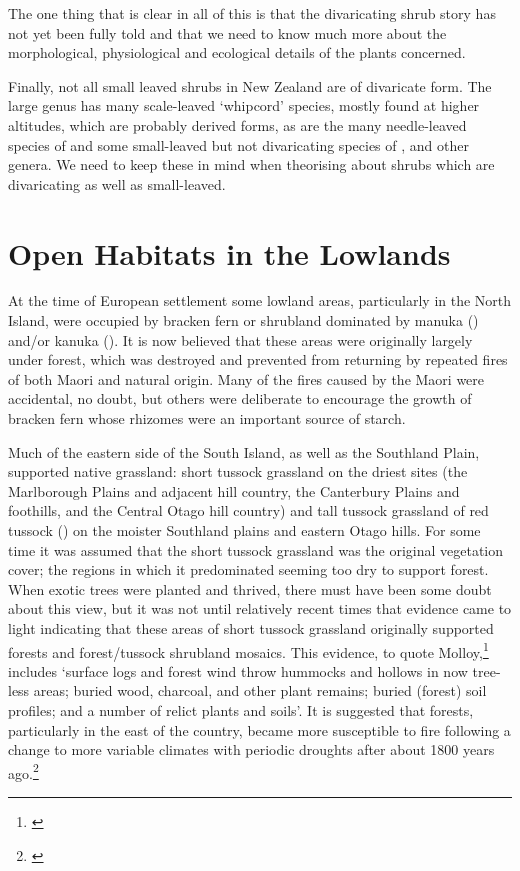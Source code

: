 The one thing that is clear in all of this is that the divaricating shrub story has not yet been fully told and that we need to know much more about the morphological, physiological and ecological details of the plants concerned.

Finally, not all small leaved shrubs in New Zealand are of divaricate form.
The large genus  has many scale-leaved `whipcord' species, mostly found at higher altitudes, which are probably derived forms, as are the many needle-leaved species of  and some small-leaved but not divaricating species of ,  and other genera.
We need to keep these in mind when theorising about shrubs which are divaricating as well as small-leaved.

\chapter{Open Habitats in the Lowlands}%
\label{ch:openhabitats}

At the time of European settlement some lowland areas, particularly in the North Island, were occupied by bracken fern or shrubland dominated by manuka () and/or kanuka ().
It is now believed that these areas were originally largely under forest, which was destroyed and prevented from returning by repeated fires of both Maori and natural origin.
Many of the fires caused by the Maori were accidental, no doubt, but others were deliberate to encourage the growth of bracken fern whose rhizomes were an important source of starch.

Much of the eastern side of the South Island, as well as the Southland Plain, supported native grassland: short tussock grassland on the driest sites (the Marlborough Plains and adjacent hill country, the Canterbury Plains and foothills, and the Central Otago hill country) and tall tussock grassland of red tussock () on the moister Southland plains and eastern Otago hills.
For some time it was assumed that the short tussock grassland was the original vegetation cover; the regions in which it predominated seeming too dry to support forest.
When exotic trees were planted and thrived, there must have been some doubt about this view, but it was not until relatively recent times that evidence came to light indicating that these areas of short tussock grassland originally supported forests and forest/tussock shrubland mosaics.
This evidence, to quote Molloy,\footnote{\cite{molloybpj1963distribution}} includes `surface logs and forest wind throw hummocks and hollows in now tree-less areas; buried wood, charcoal, and other plant remains; buried (forest) soil profiles; and a number of relict plants and soils'.
It is suggested that forests, particularly in the east of the country, became more susceptible to fire following a change to more variable climates with periodic droughts after about 1800 years ago.\footnote{\cite{mcglone1977ascarina}}

